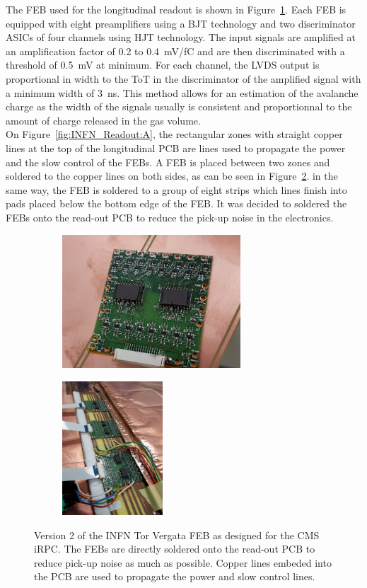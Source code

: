 	The FEB used for the longitudinal readout is shown in Figure~\ref{fig:INFN_FEBv2:A}. Each FEB is equipped with eight preamplifiers using a \acf{BJT} technology and two discriminator ASICs of four channels using \acf{HJT} technology. The input signals are amplified at an amplification factor of 0.2 to \SI{0.4}{mV/fC} and are then discriminated with a threshold of \SI{0.5}{mV} at minimum. For each channel, the LVDS output is proportional in width to the \acl{ToT} in the discriminator of the amplified signal with a minimum width of \SI{3}{ns}. This method allows for an estimation of the avalanche charge as the width of the signals usually is consistent and proportionnal to the amount of charge released in the gas volume.\\
	On Figure~\ref{fig:INFN_Readout:A}, the rectangular zones with straight copper lines at the top of the longitudinal PCB are lines used to propagate the power and the slow control of the FEBs. A FEB is placed between two zones and soldered to the copper lines on both sides, as can be seen in Figure~\ref{fig:INFN_FEBv2:B}. in the same way, the FEB is soldered to a group of eight strips which lines finish into pads placed below the bottom edge of the FEB. It was decided to soldered the FEBs onto the read-out PCB to reduce the pick-up noise in the electronics.
	 
	\begin{figure}[H]
		\begin{subfigure}{.6\linewidth}
		    \centering
			\includegraphics[height = 5cm]{fig/chapt6/INFN-FEB.png}
			\caption{\label{fig:INFN_FEBv2:A}}
		\end{subfigure}
		\begin{subfigure}{.4\linewidth}
		    \centering
			\includegraphics[height = 5cm]{fig/chapt6/INFN-FEB-on-readout.png}
			\caption{\label{fig:INFN_FEBv2:B}}
		\end{subfigure}
		\caption{\label{fig:INFN_FEBv2} Version 2 of the INFN Tor Vergata FEB as designed for the CMS iRPC. The FEBs are directly soldered onto the read-out PCB to reduce pick-up noise as much as possible. Copper lines embeded into the PCB are used to propagate the power and slow control lines.}
    \end{figure}
    

